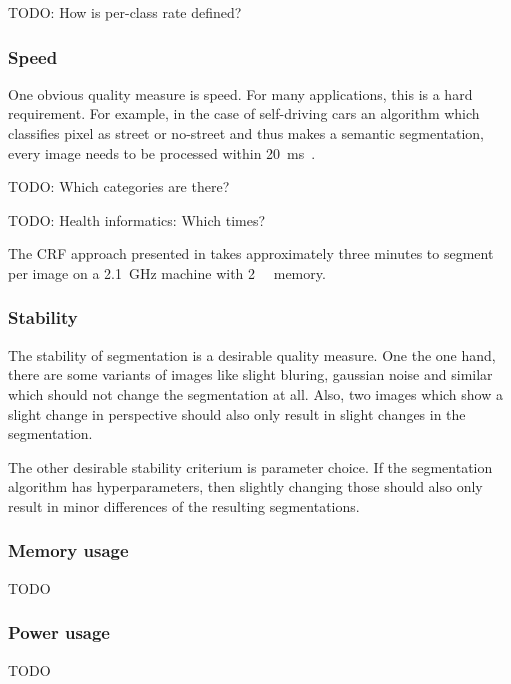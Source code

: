TODO: How is per-class rate defined?


\subsubsection{Speed}\label{subsubsec:speed-quality-measure}
One obvious quality measure is speed. For many applications, this is a hard
requirement. For example, in the case of self-driving cars an algorithm which
classifies pixel as street or no-street and thus makes a semantic segmentation,
every image needs to be processed within
\SI{20}{\milli\second}~\cite{bittel2015pixel}.

TODO: Which categories are there?

TODO: Health informatics: Which times?

The \gls{CRF} approach presented in \cite{shotton2006textonboost} takes
approximately three minutes to segment per image on a \SI{2.1}{\giga\hertz}
machine with \SI{2}{\giga\byte} memory.


\subsubsection{Stability}\label{subsubsec:stability-quality-measure}
The stability of segmentation is a desirable quality measure. One the one hand,
there are some variants of images like slight bluring, gaussian noise and
similar which should not change the segmentation at all. Also, two images which
show a slight change in perspective should also only result in slight changes
in the segmentation.\cite{pantofaru2005comparison}

The other desirable stability criterium is parameter choice. If the
segmentation algorithm has hyperparameters, then slightly changing those should
also only result in minor differences of the resulting segmentations.\cite{pantofaru2005comparison}

\subsubsection{Memory usage}

TODO

\subsubsection{Power usage}

TODO
